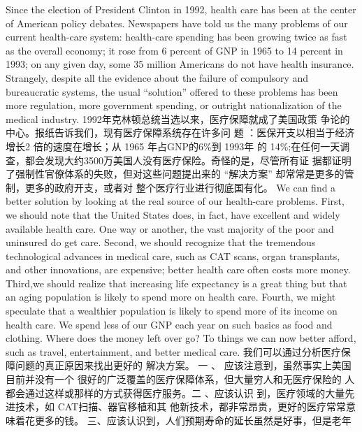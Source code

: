 \begin{paracol}{2}
Since the election of President Clinton in 1992, health care has
been at the center of American policy debates. Newspapers have told us the many problems of our current health-care system: health-care spending has been growing twice as fast as the
overall economy; it rose from 6 percent of GNP in 1965 to 14
percent in 1993; on any given day, some 35 million Americans
do not have health insurance. Strangely, despite all the evidence
about the failure of compulsory and bureaucratic systems, the
usual ``solution'' offered to these problems has been more regulation, more government spending, or outright nationalization
of the medical industry.
\switchcolumn
1992年克林顿总统当选以来，医疗保障就成了美国政策
争论的中心。报纸告诉我们，现有医疗保障系统存在许多问
题 ：医保开支以相当于经济增长2 倍的速度在增长；从 1965
年占GNP的6\%到 1993年 的 14\%;在任何一天调查，都会发现大约3500万美国人没有医疗保险。奇怪的是，尽管所有证
据都证明了强制性官僚体系的失败，但对这些问题提出来的
“解决方案” 却常常是更多的管制，更多的政府开支，或者对
整个医疗行业进行彻底国有化。
\switchcolumn*
We can find a better solution by looking at the real source of
our health-care problems. First, we should note that the United
States does, in fact, have excellent and widely available health
care. One way or another, the vast majority of the poor and
uninsured do get care. Second, we should recognize that the
tremendous technological advances in medical care, such as
CAT scans, organ transplants, and other innovations, are expensive; better health care often costs more money. Third,we should
realize that increasing life expectancy is a great thing but that an
aging population is likely to spend more on health care. Fourth,
we might speculate that a wealthier population is likely to spend
more of its income on health care. We spend less of our GNP
each year on such basics as food and clothing. Where does the
money left over go? To things we can now better afford, such as
travel, entertainment, and better medical care.
\switchcolumn
我们可以通过分析医疗保障问题的真正原因来找出更好的
解决方案。 一 、 应该注意到，虽然事实上美国目前并没有一个
很好的广泛覆盖的医疗保障体系，但大量穷人和无医疗保险的
人都会通过这样或那样的方式获得医疗服务。二 、应该认识
到，医疗领域的大量先进技术，如 CAT扫描、器官移植和其
他新技术，都非常昂贵，更好的医疗常常意味着花更多的钱。
三、应该认识到，人们预期寿命的延长虽然是好事，但是老年

\end{paracol}
